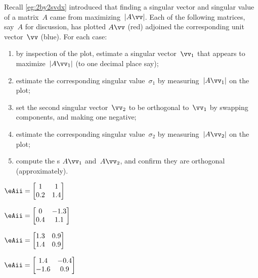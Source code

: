 \begin{exercise}  
Recall \cref{eg:2by2svdx} introduced that finding a singular vector and singular value of a matrix~\(A\) came from maximizing~\(|A\vv|\).
Each of the following matrices, say~\(A\) for discussion, has plotted \(A\vv\) (red) adjoined the corresponding unit vector~\(\vv\) (blue).
For each case:
\begin{enumerate}[label=\roman*.]
\item by inspection of the plot, estimate a singular vector~\(\vv_1\) that appears to maximize~\(|A\vv_1|\) (to one decimal place say);
\item estimate the corresponding singular value~\(\sigma_1\) by measuring~\(|A\vv_1|\) on the plot;
\item set the second singular vector~\(\vv_2\) to be orthogonal to~\(\vv_1\) by swapping components, and making one negative;
\item estimate the corresponding singular value~\(\sigma_2\) by measuring~\(|A\vv_2|\) on the plot;
\item compute the s \(A\vv_1\) and~\(A\vv_2\), and confirm they are orthogonal (approximately).
\end{enumerate}

\def\eRosesize{small}
\begin{Parts}
\item \(\eAii=\begin{bmatrix} 1&1\\0.2&1.4 \end{bmatrix}\) 

\item \(\eAii=\begin{bmatrix} 0&-1.3\\0.4&1.1 \end{bmatrix}\) 

\item \(\eAii=\begin{bmatrix} 1.3&0.9\\1.4&0.9 \end{bmatrix}\) 

\item \(\eAii=\begin{bmatrix} 1.4&-0.4\\-1.6&0.9 \end{bmatrix}\) 

\end{Parts}
\end{exercise}






